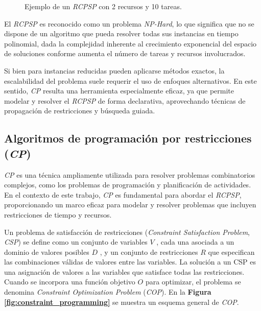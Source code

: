 \documentclass{article}
\begin{document}
\begin{figure}[htbp]
    \centering
    \caption{Ejemplo de un \textit{RCPSP} con 2 recursos y 10 tareas.}
    \label{fig:rcpsp}
\end{figure}
    

El \textit{RCPSP} es reconocido como un problema \textit{NP-Hard}, lo que significa que no se dispone de un algoritmo que pueda resolver todas sus instancias en tiempo polinomial, dada la complejidad inherente al crecimiento exponencial del espacio de soluciones conforme aumenta el número de tareas y recursos involucrados.

Si bien para instancias reducidas pueden aplicarse métodos exactos, la escalabilidad del problema suele requerir el uso de enfoques alternativos. En este sentido, \textit{CP} resulta una herramienta especialmente eficaz, ya que permite modelar y resolver el \textit{RCPSP} de forma declarativa, aprovechando técnicas de propagación de restricciones y búsqueda guiada.



\subsection{Algoritmos de programación por restricciones (\textit{CP})}

\textit{CP} es una técnica ampliamente utilizada para resolver problemas combinatorios complejos, como los problemas de programación y planificación de actividades. En el contexto de este trabajo, \textit{CP} es fundamental para abordar el \textit{RCPSP}, proporcionando un marco eficaz para modelar y resolver problemas que incluyen restricciones de tiempo y recursos.

Un problema de satisfacción de restricciones (\textit{Constraint Satisfaction Problem}, \textit{CSP}) se define como un conjunto de variables  $V$ , cada una asociada a un dominio de valores posibles  $D$ , y un conjunto de restricciones  $R$  que especifican las combinaciones válidas de valores entre las variables. La solución a un CSP es una asignación de valores a las variables que satisface todas las restricciones. Cuando se incorpora una función objetivo  $O$  para optimizar, el problema se denomina \textit{Constraint Optimization Problem} (\textit{COP})\cite{rossi2006}. En la \textbf{Figura \ref{fig:constraint_programming}} se muestra un esquema general de \textit{COP}.
\end{document}
